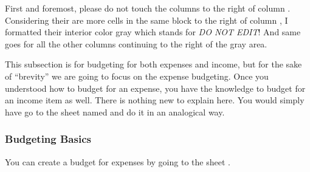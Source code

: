 First and foremost, please do not touch the columns to the right of column .
Considering their are more cells in the same block to the right of column , I formatted their interior color gray which stands for \emph{DO NOT EDIT}!
And same goes for all the other columns continuing to the right of the gray area.

This subsection is for budgeting for both expenses and income, but for the sake of ``brevity'' we are going to focus on the expense budgeting.
Once you understood how to budget for an expense, you have the knowledge to budget for an income item as well. There is nothing new to explain here.
You would simply have go to the sheet named  and do it in an analogical way.

\subsubsection{Budgeting Basics}
\label{subsubsec:budgeting-basics}

You can create a budget for expenses by going to the sheet .

